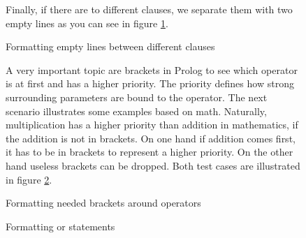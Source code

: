 \documentclass{article}
\begin{document}
\begin{figure}[h]
Finally, if there are to different clauses, we separate them with two empty lines as you can see in figure \ref{lst:diffclauses}.\\

\begin{minipage}{.5\textwidth}

\end{minipage}
\hfill
\begin{minipage}{.5\textwidth}

\end{minipage}

\caption{Formatting empty lines between different clauses}
\label{lst:diffclauses}
\end{figure}

\begin{figure}[h] A very important topic are brackets in Prolog to see which operator is at first and has a higher priority. The priority defines how strong surrounding parameters are bound to the operator. The next scenario illustrates some examples based on math. Naturally, multiplication has a higher priority than addition in mathematics, if the addition is not in brackets. On one hand if addition comes first, it has to be in brackets to represent a higher priority. On the other hand useless brackets can be dropped. Both test cases are illustrated in figure \ref{lst:operator_brackets}.\\

\begin{minipage}{.5\textwidth}

\end{minipage}
\hfill
\begin{minipage}{.5\textwidth}

\end{minipage}

\caption{Formatting needed brackets around operators}
\label{lst:operator_brackets}
\end{figure}

\begin{figure}[h]

\begin{minipage}{.5\textwidth}

\end{minipage}
\hfill
\begin{minipage}{.5\textwidth}

\end{minipage}

\caption{Formatting or statements}
\label{lst:or}
\end{figure}
\end{document}
